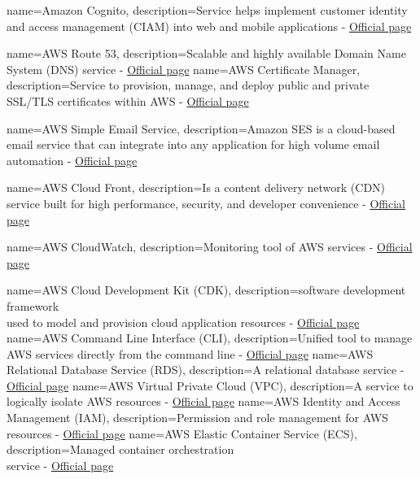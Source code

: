 {
        name=Amazon Cognito,
        description={Service helps implement customer identity and access management (CIAM) into web and mobile applications - \href{https://aws.amazon.com/cognito/}{Official page}}
}

{
        name=AWS Route 53,
        description={Scalable and highly available Domain Name System (DNS) service - \href{https://aws.amazon.com/route53/}{Official page}}
}
{
        name=AWS Certificate Manager,
        description={Service to provision, manage, and deploy public and private SSL/TLS certificates within AWS - \href{https://aws.amazon.com/certificate-manager/}{Official page}}
}

{
        name=AWS Simple Email Service,
        description={Amazon SES is a cloud-based email service that can integrate into any application for high volume email automation - \href{https://aws.amazon.com/ses/}{Official page}}
}

{
        name=AWS Cloud Front,
        description={Is a content delivery network (CDN) service built for high performance, security, and developer convenience - \href{https://aws.amazon.com/cloudfront/}{Official page}}
}

{
        name=AWS CloudWatch,
        description={Monitoring tool of AWS services - \href{https://www.google.com/search?client=safari&rls=en&q=aws+cloudwatch&ie=UTF-8&oe=UTF-8}{Official page}}
}

{
        name=AWS Cloud Development Kit (CDK),
        description={software development framework \\ used to model and provision cloud application resources  - \href{https://aws.amazon.com/cdk/}{Official page}}
}
{
        name=AWS Command Line Interface (CLI),
        description={Unified tool to manage AWS services directly from the command line - \href{https://aws.amazon.com/cli/}{Official page}}
}
{
        name=AWS Relational Database Service (RDS),
        description={A relational database service - \href{https://aws.amazon.com/rds/}{Official page}}
}
{
        name=AWS Virtual Private Cloud (VPC),
        description={A service to logically isolate AWS resources - \href{https://docs.aws.amazon.com/vpc/latest/userguide/what-is-amazon-vpc.html}{Official page}}
}
{
        name=AWS Identity and Access Management (IAM),
        description={Permission and role management for AWS resources - \href{https://aws.amazon.com/iam/}{Official page}}
}
{
        name=AWS Elastic Container Service (ECS),
        description={Managed container orchestration \\ service - \href{https://aws.amazon.com/ecs/}{Official page}}
}

